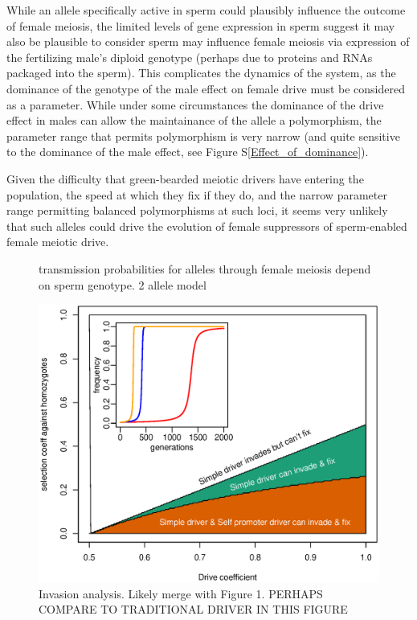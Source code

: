 \documentclass[12pt,letterpaper]{article}
\newcommand{\yb}[1]{{ \color{blue} #1}}
\begin{document}
While an allele specifically active in sperm could plausibly influence the outcome of female meiosis, the limited levels of gene expression in sperm \citep[e.g.][]{Joseph2004}
	suggest it may also be plausible to consider 
sperm may influence female meiosis via expression of the fertilizing male's
diploid genotype (perhaps due to proteins and RNAs packaged into the sperm).
This complicates the dynamics of the system, as the dominance of
  the genotype of the male effect on female drive must be considered as a parameter. 
While under some circumstances the dominance of the drive effect in
males can allow the 
maintainance of the allele a polymorphism, the parameter range that
permits polymorphism is very narrow (and quite sensitive to the
dominance of the male effect, see Figure S\ref{Effect_of_dominance}).

Given the difficulty that green-bearded meiotic drivers have entering the population, the speed at
which they fix if they do,
and the narrow parameter range permitting balanced polymorphisms at such loci, 
it seems very unlikely that such alleles
could drive the evolution of female suppressors of sperm-enabled
female meiotic drive.

\begin{figure}
\caption{transmission probabilities for alleles through female
  meiosis depend on sperm genotype. 2 allele model}  
\label{Eggsperm_2_allele_cartoon}
\end{figure}

\begin{figure}
\includegraphics[width = 0.8 \textwidth]{Figures/invasion_space_recessive_driver.eps}
\caption{Invasion analysis. Likely merge with Figure 1. \yb{PERHAPS COMPARE TO TRADITIONAL DRIVER IN THIS FIGURE} } \label{Invasion_space}
\end{figure}
\end{document}
